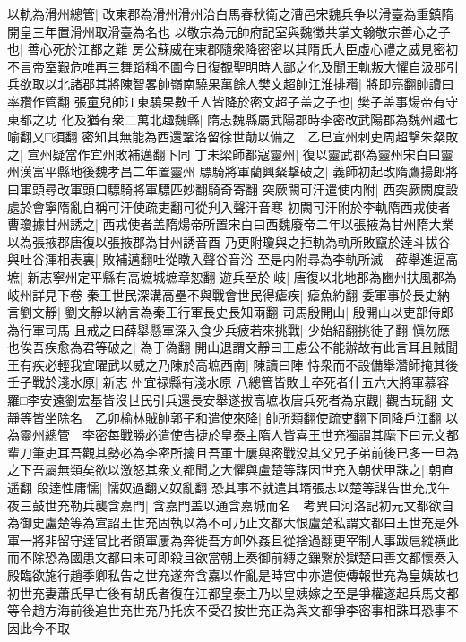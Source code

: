 以軌為滑州總管|{
	改東郡為滑州滑州治白馬春秋衛之漕邑宋魏兵争以滑臺為重鎮隋開皇三年置滑州取滑臺為名也}
以敬宗為元帥府記室與魏徵共掌文翰敬宗善心之子也|{
	善心死於江都之難}
房公蘇威在東郡隨衆降密密以其隋氏大臣虛心禮之威見密初不言帝室艱危唯再三舞蹈稱不圖今日復覩聖明時人鄙之化及聞王軌叛大懼自汲郡引兵欲取以北諸郡其將陳智畧帥嶺南驍果萬餘人樊文超帥江淮排䂎|{
	將即亮翻帥讀曰率䂎作管翻}
張童兒帥江東驍果數千人皆降於密文超子盖之子也|{
	樊子盖事煬帝有守東都之功}
化及猶有衆二萬北趣魏縣|{
	隋志魏縣屬武陽郡時李密改武陽郡為魏州趣七喻翻又□須翻}
密知其無能為西還鞏洛留徐世勣以備之　乙巳宣州刺吏周超撃朱粲敗之|{
	宣州疑當作宜州敗補邁翻下同}
丁未梁師都寇靈州|{
	復以靈武郡為靈州宋白曰靈州漢富平縣地後魏孝昌二年置靈州}
驃騎將軍藺興粲撃破之|{
	義師初起改隋鷹揚郎將曰軍頭尋改軍頭口驃騎將軍驃匹妙翻騎奇寄翻}
突厥闕可汗遣使内附|{
	西突厥闕度設處於會寧隋亂自稱可汗使疏吏翻可從刋入聲汗音寒}
初闕可汗附於李軌隋西戎使者曹瓊據甘州誘之|{
	西戎使者盖隋煬帝所置宋白曰西魏廢帝二年以張掖為甘州隋大業以為張掖郡唐復以張掖郡為甘州誘音酉}
乃更附瓊與之拒軌為軌所敗竄於逹斗拔谷與吐谷渾相表裏|{
	敗補邁翻吐從暾入聲谷音浴}
至是内附尋為李軌所滅　薛舉進逼高墌|{
	新志寧州定平縣有高墌城墌章恕翻}
遊兵至於岐|{
	唐復以北地郡為豳州扶風郡為岐州詳見下卷}
秦王世民深溝高壘不與戰會世民得瘧疾|{
	瘧魚約翻}
委軍事於長史納言劉文靜|{
	劉文靜以納言為秦王行軍長史長知兩翻}
司馬殷開山|{
	殷開山以吏部侍郎為行軍司馬}
且戒之曰薛舉懸軍深入食少兵疲若來挑戰|{
	少始紹翻挑徒了翻}
愼勿應也俟吾疾愈為君等破之|{
	為于偽翻}
開山退謂文靜曰王慮公不能辦故有此言耳且賊聞王有疾必輕我宜曜武以威之乃陳於高墌西南|{
	陳讀曰陣}
恃衆而不設備舉濳師掩其後壬子戰於淺水原|{
	新志州宜禄縣有淺水原}
八總管皆敗士卒死者什五六大將軍慕容羅□李安遠劉宏基皆沒世民引兵還長安舉遂拔高墌收唐兵死者為京觀|{
	觀古玩翻}
文靜等皆坐除名　乙卯榆林賊帥郭子和遣使來降|{
	帥所類翻使疏吏翻下同降戶江翻}
以為靈州總管　李密每戰勝必遣使告捷於皇泰主隋人皆喜王世充獨謂其麾下曰元文都輩刀筆吏耳吾觀其勢必為李密所擒且吾軍士屢與密戰没其父兄子弟前後已多一旦為之下吾屬無類矣欲以激怒其衆文都聞之大懼與盧楚等謀因世充入朝伏甲誅之|{
	朝直遥翻}
段逹性庸懦|{
	懦奴過翻又奴亂翻}
恐其事不就遣其壻張志以楚等謀告世充戊午夜三鼓世充勒兵襲含嘉門|{
	含嘉門盖以通含嘉城而名　考異曰河洛記初元文都欲自為御史盧楚等為宣詔王世充固執以為不可乃止文都大恨盧楚私謂文都曰王世充是外軍一將非留守逹官比者領軍屢為奔徙吾方卹外姦且從捨過翻更宰制人事跋扈縱横此而不除恐為國患文都曰未可即殺且欲當朝上奏御前縳之鏁繋於獄楚曰善文都懷奏入殿臨欲施行趙季卿私告之世充遂奔含嘉以作亂是時宫中亦遣使傳報世充為皇姨故也初世充妻蕭氏早亡後有胡氏者復在江都皇泰主乃以皇姨嫁之至是爭權遂起兵馬文都等令趙方海前後追世充世充乃托疾不受召按世充正為與文都爭李密事相誅耳恐事不因此今不取}

